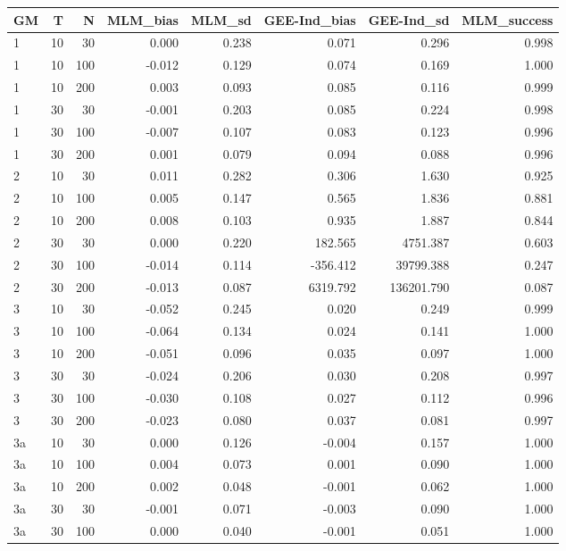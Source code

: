 \begin{table}[ht]
\centering
\begin{tabular}{lrrrrrrr}
  \hline
GM & T & N & MLM\_bias & MLM\_sd & GEE-Ind\_bias & GEE-Ind\_sd & MLM\_success \\ 
  \hline
1 & 10 & 30 & 0.000 & 0.238 & 0.071 & 0.296 & 0.998 \\ 
  1 & 10 & 100 & -0.012 & 0.129 & 0.074 & 0.169 & 1.000 \\ 
  1 & 10 & 200 & 0.003 & 0.093 & 0.085 & 0.116 & 0.999 \\ 
  1 & 30 & 30 & -0.001 & 0.203 & 0.085 & 0.224 & 0.998 \\ 
  1 & 30 & 100 & -0.007 & 0.107 & 0.083 & 0.123 & 0.996 \\ 
  1 & 30 & 200 & 0.001 & 0.079 & 0.094 & 0.088 & 0.996 \\ 
  2 & 10 & 30 & 0.011 & 0.282 & 0.306 & 1.630 & 0.925 \\ 
  2 & 10 & 100 & 0.005 & 0.147 & 0.565 & 1.836 & 0.881 \\ 
  2 & 10 & 200 & 0.008 & 0.103 & 0.935 & 1.887 & 0.844 \\ 
  2 & 30 & 30 & 0.000 & 0.220 & 182.565 & 4751.387 & 0.603 \\ 
  2 & 30 & 100 & -0.014 & 0.114 & -356.412 & 39799.388 & 0.247 \\ 
  2 & 30 & 200 & -0.013 & 0.087 & 6319.792 & 136201.790 & 0.087 \\ 
  3 & 10 & 30 & -0.052 & 0.245 & 0.020 & 0.249 & 0.999 \\ 
  3 & 10 & 100 & -0.064 & 0.134 & 0.024 & 0.141 & 1.000 \\ 
  3 & 10 & 200 & -0.051 & 0.096 & 0.035 & 0.097 & 1.000 \\ 
  3 & 30 & 30 & -0.024 & 0.206 & 0.030 & 0.208 & 0.997 \\ 
  3 & 30 & 100 & -0.030 & 0.108 & 0.027 & 0.112 & 0.996 \\ 
  3 & 30 & 200 & -0.023 & 0.080 & 0.037 & 0.081 & 0.997 \\ 
  3a & 10 & 30 & 0.000 & 0.126 & -0.004 & 0.157 & 1.000 \\ 
  3a & 10 & 100 & 0.004 & 0.073 & 0.001 & 0.090 & 1.000 \\ 
  3a & 10 & 200 & 0.002 & 0.048 & -0.001 & 0.062 & 1.000 \\ 
  3a & 30 & 30 & -0.001 & 0.071 & -0.003 & 0.090 & 1.000 \\ 
  3a & 30 & 100 & 0.000 & 0.040 & -0.001 & 0.051 & 1.000 \\ 

\end{tabular}
\end{table}
